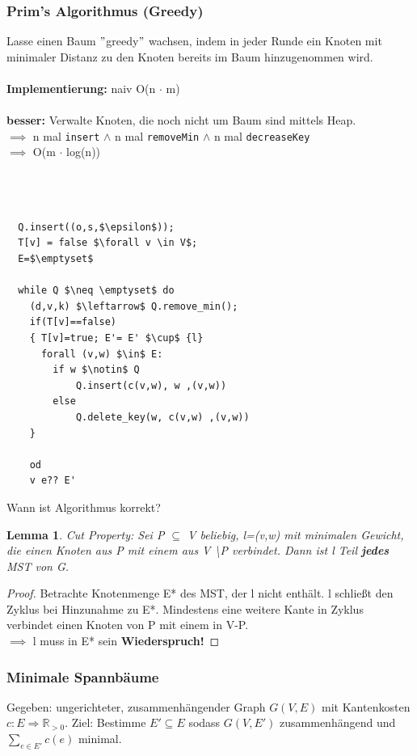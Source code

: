 \documentclass{article}
\newtheorem{lem}[thm]{Lemma}
\begin{document}
\subsubsection{Prim's Algorithmus  (Greedy)}
Lasse einen Baum $"$greedy$"$ wachsen, indem in jeder Runde ein Knoten mit minimaler Distanz zu den Knoten bereits im Baum
hinzugenommen wird. \\
\\
\textbf{Implementierung:} naiv O(n $\cdot$ m)\\
\\
\textbf{besser:} Verwalte Knoten, die noch nicht um Baum sind mittels Heap.\\
$\implies$ n mal \texttt{insert} $\land$
 n mal \texttt{removeMin} $\land$
 n mal \texttt{decreaseKey}
 \\
 $\implies$ O(m $\cdot$ log(n))\\
 \\

 \begin{verbatim}
     
 
  Q.insert((o,s,$\epsilon$)); 
  T[v] = false $\forall v \in V$; 
  E=$\emptyset$

  while Q $\neq \emptyset$ do 
    (d,v,k) $\leftarrow$ Q.remove_min();
    if(T[v]==false)
    { T[v]=true; E'= E' $\cup$ {l} 
      forall (v,w) $\in$ E:
        if w $\notin$ Q
            Q.insert(c(v,w), w ,(v,w))
        else
            Q.delete_key(w, c(v,w) ,(v,w))
    }

    od
    v e?? E'
 \end{verbatim}

 Wann ist Algorithmus korrekt?
 \begin{lem}
 Cut Property: Sei P $\subseteq$ V beliebig, l=(v,w) mit minimalen Gewicht, die einen Knoten aus P mit einem aus V \textbackslash P verbindet.
 Dann ist l Teil \textbf{jedes} MST von G.
 \end{lem}

 \begin{proof}
 Betrachte Knotenmenge E* des MST, der l nicht enthält. l schließt den Zyklus bei Hinzunahme zu E*. Mindestens eine weitere Kante
 in Zyklus verbindet einen Knoten von P mit einem in V-P.\\
 $\implies$ l muss in E* sein {\textbf{Wiederspruch!}}
 \end{proof}
\subsubsection{Minimale Spannbäume}
Gegeben: ungerichteter, zusammenhängender Graph $G(V,E)$ mit Kantenkosten $c:E\Rightarrow \mathbb{R}_{>0}$. Ziel: Bestimme $E'\subseteq E$ sodass $G(V,E')$ zusammenhängend und $\sum_{e\in E'} c(e)$ minimal.
\end{document}
